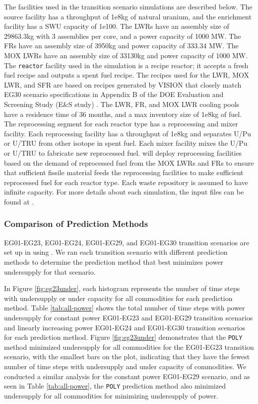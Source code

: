 The facilities used in the transition scenario simulations are described below. 
The source facility has a throughput of 1e8kg of natural uranium, and the enrichment 
facility has a SWU capacity of 1e100. The LWRs have an 
assembly size of 29863.3kg with 3 assemblies per core, and a power capacity of 1000 MW. 
The FRs have an assembly size  of 3950kg and power capacity of 333.34 MW.
The MOX LWRs have an assembly size of 33130kg and power capacity of 1000 MW. 
The \texttt{reactor} facility used in the \Cyclus simulation 
is a recipe reactor; it accepts a fresh fuel recipe and outputs 
a spent fuel recipe. 
The recipes used for the \gls{LWR}, \gls{MOX} \gls{LWR}, and 
\gls{SFR} are based on recipes generated by VISION 
\cite{bae_arfctransition-scenarios_2019}
that closely match EG30 scenario specifications in 
Appendix B of the \gls{DOE} Evaluation and Screening Study 
(E\&S study) \cite{wigeland_nuclear_2014}. 
The LWR, FR, and MOX LWR cooling pools have a residence time of 36 months, and a max 
inventory size of 1e8kg of fuel. 
The reprocessing segment for each reactor type has a reprocessing and mixer facility. 
Each reprocessing facility has a throughput of 1e8kg and separates U/Pu or U/TRU from 
other isotope in spent fuel. 
Each mixer facility mixes the U/Pu or U/TRU to fabricate new reprocessed fuel.  
\deploy will deploy reprocessing facilities based on the demand of reprocessed fuel 
from the MOX LWRs and FRs to ensure that sufficient fissile material 
feeds the reprocessing facilities to make sufficient reprocessed fuel 
for each reactor type. 
Each waste repository is assumed to have infinite capacity. 
For more details about each simulation, the input files can be found at 
\cite{bae_arfctransition-scenarios_2019}. 


\subsubsection{Comparison of Prediction Methods}
\label{sec:complex1}
EG01-EG23, EG01-EG24, EG01-EG29, and EG01-EG30 transition scenarios
are set up in \Cyclus using \deploy. 
We ran each transition scenario with different prediction 
methods to determine the prediction method that best minimizes 
power undersupply for that scenario. 

In Figure \ref{fig:eg23under}, each histogram represents 
the number of time steps with undersupply or 
under capacity for all commodities for each prediction method.  
Table \ref{tab:all-power} shows the total number of time steps with power 
undersupply for constant power EG01-EG23 and EG01-EG29 transition scenarios and
linearly increasing power EG01-EG24 and EG01-EG30 transition scenarios
for each prediction method. 
Figure \ref{fig:eg23under} demonstrates that the \texttt{POLY} method
minimized undersupply for all commodities for the EG01-EG23 transition scenario,
with the smallest bars on the plot, indicating that they have the 
fewest number of time steps with undersupply and under capacity
of commodities. 
We conducted a similar analysis for the constant power EG01-EG29 scenario,
and as seen in Table \ref{tab:all-power}, the \texttt{POLY} prediction method 
also minimized undersupply for all commodities for minimizing undersupply of power.  

